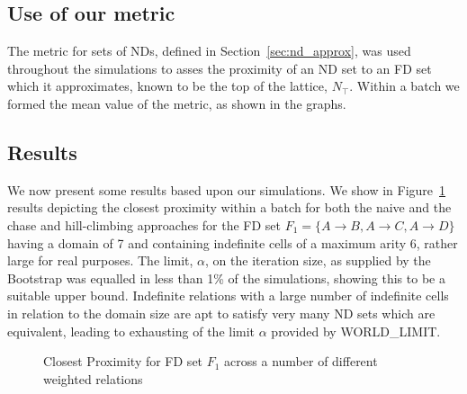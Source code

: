 \subsection{Use of our metric}\label{subsec:cp_metric_use}
The metric for sets of NDs, defined in Section~\ref{sec:nd_approx},
was used throughout the simulations to asses the proximity of an ND
set to an FD set which it approximates, known to be the top of the
lattice, $N_{\top}$. Within a batch we formed the mean value of the
metric, as shown in the graphs.   

\subsection{Results}\label{sol:res}

We now present some results based upon our simulations. We show
in Figure~\ref{graph:4.1} results depicting the closest proximity
within a batch for 
both the naive and the chase and hill-climbing approaches for the
FD set $F_1 = \{A \to B, A \to C, A \to D \}$ having a domain of 7 and 
containing indefinite cells of a maximum arity 6, rather large for
real purposes.  The limit, $\alpha$,  
on the iteration size, as supplied by the Bootstrap was 
equalled in less than 1\% of the simulations, showing this to
be a suitable upper bound. Indefinite relations with a large number of
indefinite cells in relation to the domain size are apt to satisfy
very many ND sets which are equivalent, leading to exhausting of the
limit $\alpha$ provided by WORLD\_LIMIT.

\begin{figure}
\centerline{}
\caption{\label{graph:4.1} {Closest Proximity for FD set $F_1$ across a number of different weighted relations}}
\end{figure}

\smallskip

